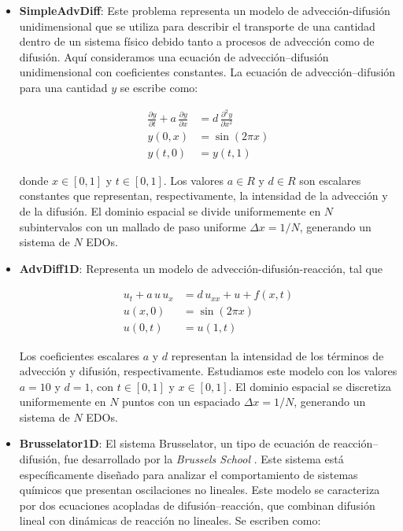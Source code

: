 \begin{itemize}
	\item \textbf{SimpleAdvDiff}: Este problema representa un modelo de advección-difusión unidimensional que se utiliza para describir el transporte de una cantidad dentro de un sistema físico debido tanto a procesos de advección como de difusión\cite{Marabeh2024}. Aquí consideramos una ecuación de advección–difusión unidimensional con coeficientes constantes. La ecuación de advección–difusión para una cantidad $y$ se escribe como:
	
	\begin{equation}
		\begin{split}
			\frac{\partial y}{\partial t} + a\,\frac{\partial y}{\partial x} &= d\,\frac{\partial^2 y}{\partial x^2}\\
			y(0, x) &= \sin(2\pi x)\\
			y(t, 0) &= y(t, 1)
		\end{split}
	\end{equation}
	
	donde $x \in [0,1]$ y $t \in [0,1]$. Los valores $a \in R$ y $d \in R$ son escalares constantes que representan, respectivamente, la intensidad de la advección y de la difusión. El dominio espacial se divide uniformemente en $N$ subintervalos con un mallado de paso uniforme $\Delta x = 1/N$, generando un sistema de $N$ EDOs.
	
	\item \textbf{AdvDiff1D}: Representa un modelo de advección-difusión-reacción\cite{Marabeh2023}, tal que
	
	\begin{equation}
		\begin{split}
			u_t + a\,u\,u_x &= d\,u_{xx} + u + f(x,t)\\
			u(x,0) &= \sin(2\pi x)\\
			u(0,t) &= u(1,t)
		\end{split}
	\end{equation}	
	
	Los coeficientes escalares $a$ y $d$ representan la intensidad de los términos de advección y difusión, respectivamente. Estudiamos este modelo con los valores $a = 10$ y $d = 1$, con $t \in [0,1]$ y $x \in [0,1]$. El dominio espacial se discretiza uniformemente en $N$ puntos con un espaciado $\Delta x = 1/N$, generando un sistema de $N$ EDOs. 
	
	\item \textbf{Brusselator1D}: El sistema Brusselator, un tipo de ecuación de reacción–difusión, fue desarrollado por la \textit{Brussels School} \cite{Lefever1971}. Este sistema está específicamente diseñado para analizar el comportamiento de sistemas químicos que presentan oscilaciones no lineales. Este modelo se caracteriza por dos ecuaciones acopladas de difusión–reacción, que combinan difusión lineal con dinámicas de reacción no lineales\cite{Marabeh2025}. Se escriben como:
	

\end{itemize}
